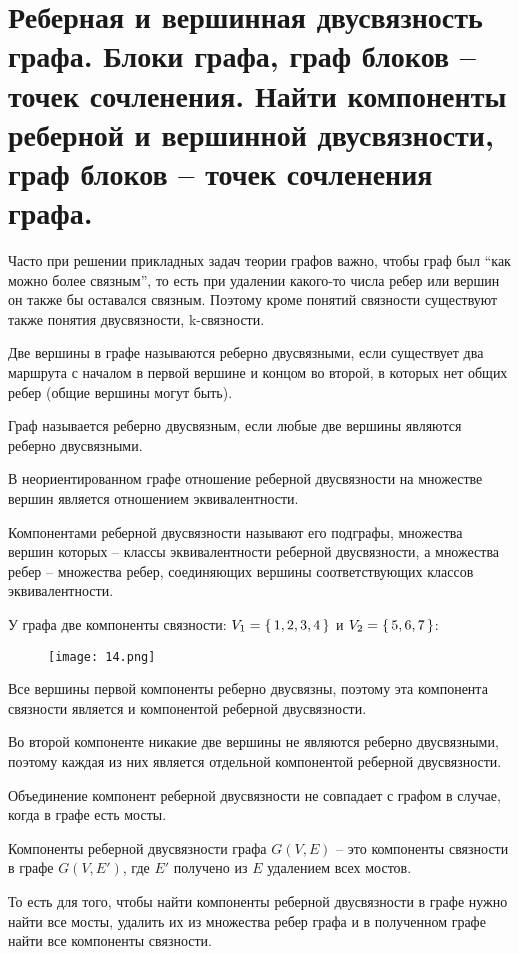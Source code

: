 \section{Реберная и вершинная двусвязность графа. Блоки графа, граф блоков – точек сочленения. Найти 
компоненты реберной и вершинной двусвязности, граф блоков – точек сочленения графа.}

Часто при решении прикладных задач теории графов важно, чтобы граф был
“как можно более связным”, то есть при удалении какого-то числа ребер или
вершин он также бы оставался связным. Поэтому кроме понятий связности
существуют также понятия двусвязности, k-связности.

\begin{definition}
    Две вершины в графе называются реберно двусвязными, если
    существует два маршрута с началом в первой вершине и концом во второй, в
    которых нет общих ребер (общие вершины могут быть).
\end{definition}

\begin{definition}
    Граф называется реберно двусвязным, если любые две
    вершины являются реберно двусвязными.
\end{definition}

\begin{theorem}
    В неориентированном графе отношение реберной двусвязности на
    множестве вершин является отношением эквивалентности.
\end{theorem}

\begin{definition}
    Компонентами реберной двусвязности называют его
    подграфы, множества вершин которых -- классы эквивалентности реберной
    двусвязности, а множества ребер -- множества ребер, соединяющих вершины
    соответствующих классов эквивалентности.
\end{definition}

У графа две компоненты связности: $V_1 = \set{1,2,3,4}$ и $V_2 = \set{5,6,7}$:
\begin{figure}[h]
    \centering
    \texttt{[image: 14.png]}
\end{figure}

Все вершины первой компоненты реберно двусвязны, поэтому эта компонента
связности является и компонентой реберной двусвязности.

Во второй компоненте никакие две вершины не являются реберно
двусвязными, поэтому каждая из них является отдельной компонентой
реберной двусвязности.

Объединение компонент реберной двусвязности не совпадает с
графом в случае, когда в графе есть мосты.

\begin{theorem}
    Компоненты реберной двусвязности графа $G(V,E)$ -- это
    компоненты связности в графе $G(V,{E}')$, где ${E}'$ получено из $E$ удалением всех
    мостов.
\end{theorem}

То есть для того, чтобы найти компоненты реберной двусвязности в графе
нужно найти все мосты, удалить их из множества ребер графа и в полученном
графе найти все компоненты связности.